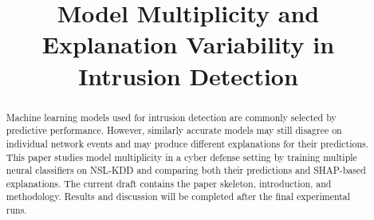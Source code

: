 \documentclass[conference]{IEEEtran}
\title{Model Multiplicity and Explanation Variability in Intrusion Detection}
\author{\IEEEauthorblockN{Silja Kluge}
\IEEEauthorblockA{University of Tuebingen\\
Tuebingen, Germany}}
\begin{document}
\maketitle

\begin{abstract}
Machine learning models used for intrusion detection are commonly selected by predictive performance. However, similarly accurate models may still disagree on individual network events and may produce different explanations for their predictions. This paper studies model multiplicity in a cyber defense setting by training multiple neural classifiers on NSL-KDD and comparing both their predictions and SHAP-based explanations. The current draft contains the paper skeleton, introduction, and methodology. Results and discussion will be completed after the final experimental runs.
\end{abstract}











\end{document}
